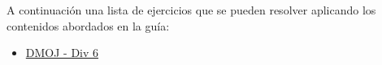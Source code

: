A continuación una lista de ejercicios que se pueden resolver aplicando los contenidos abordados en la guía:

\begin{itemize}
	\item \href{https://dmoj.uclv.edu.cu/problem/div6}{DMOJ - Div 6}
\end{itemize}